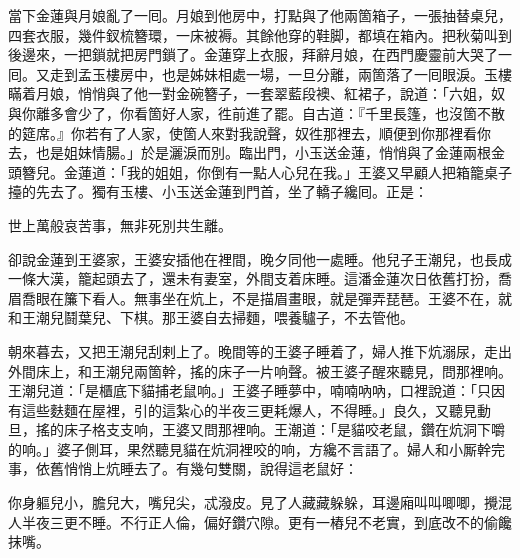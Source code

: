 當下金蓮與月娘亂了一囘。月娘到他房中，打點與了他兩箇箱子，一張抽替桌兒，四套衣服，幾件釵梳簪環，一床被褥。其餘他穿的鞋脚，都填在箱內。把秋菊叫到後邊來，一把鎖就把房門鎖了。{}金蓮穿上衣服，拜辭月娘，在西門慶靈前大哭了一囘。{}又走到孟玉樓房中，也是姊妹相處一場，一旦分離，兩箇落了一囘眼淚。玉樓瞞着月娘，悄悄與了他一對金碗簪子，一套翠藍段襖、紅裙子，說道：「六姐，奴與你離多會少了，你看箇好人家，徃前進了罷。自古道：『千里長篷，也沒箇不散的筵席。』你若有了人家，使箇人來對我說聲，奴徃那裡去，順便到你那裡看你去，也是姐妹情腸。」{}於是灑淚而別。臨出門，小玉送金蓮，悄悄與了金蓮兩根金頭簪兒。金蓮道：「我的姐姐，你倒有一點人心兒在我。」王婆又早顧人把箱籠桌子擡的先去了。獨有玉樓、小玉送金蓮到門首，坐了轎子纔囘。正是：

\begin{myquote}
世上萬般哀苦事，無非死別共生離。
\end{myquote}

卻說金蓮到王婆家，王婆安插他在裡間，晚夕同他一處睡。他兒子王潮兒，也長成一條大漢，籠起頭去了，還未有妻室，外間支着床睡。這潘金蓮次日依舊打扮，喬眉喬眼在簾下看人。無事坐在炕上，不是描眉畫眼，就是彈弄琵琶。王婆不在，就和王潮兒鬪葉兒、下棋。那王婆自去掃麵，喂養驢子，不去管他。

朝來暮去，又把王潮兒刮剌上了。晚間等的王婆子睡着了，婦人推下炕溺尿，走出外間床上，和王潮兒兩箇幹，搖的床子一片响聲。{}被王婆子醒來聽見，問那裡响。王潮兒道：「是櫃底下貓捕老鼠响。」王婆子睡夢中，喃喃吶吶，口裡說道：「只因有這些麩麵在屋裡，引的這紮心的半夜三更耗爆人，不得睡。」良久，又聽見動旦，搖的床子格支支响，王婆又問那裡响。王潮道：「是貓咬老鼠，鑽在炕洞下嚼的响。」{}婆子側耳，果然聽見貓在炕洞裡咬的响，方纔不言語了。婦人和小厮幹完事，依舊悄悄上炕睡去了。有幾句雙關，說得這老鼠好：

\begin{myquote}
你身軀兒小，膽兒大，嘴兒尖，忒潑皮。見了人藏藏躲躲，耳邊廂叫叫唧唧，攪混人半夜三更不睡。不行正人倫，偏好鑽穴隙。更有一樁兒不老實，到底改不的偷饞抹嘴。
\end{myquote}

